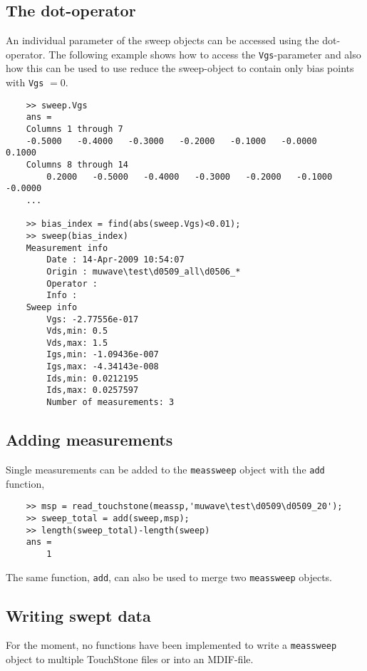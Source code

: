 \subsection{The dot-operator}
An individual parameter of the sweep objects can be accessed using
the dot-operator. The following example shows how to access the
\verb"Vgs"-parameter and also how this can be used to use reduce
the sweep-object to contain only bias points with \verb"Vgs" $=0$.
\begin{small}
\begin{verbatim}
    >> sweep.Vgs
    ans =
    Columns 1 through 7
    -0.5000   -0.4000   -0.3000   -0.2000   -0.1000   -0.0000    0.1000
    Columns 8 through 14
        0.2000   -0.5000   -0.4000   -0.3000   -0.2000   -0.1000   -0.0000
    ...

    >> bias_index = find(abs(sweep.Vgs)<0.01);
    >> sweep(bias_index)
    Measurement info
        Date : 14-Apr-2009 10:54:07
        Origin : muwave\test\d0509_all\d0506_*
        Operator :
        Info :
    Sweep info
    	Vgs: -2.77556e-017
    	Vds,min: 0.5
    	Vds,max: 1.5
    	Igs,min: -1.09436e-007
    	Igs,max: -4.34143e-008
    	Ids,min: 0.0212195
    	Ids,max: 0.0257597
    	Number of measurements: 3
\end{verbatim}
\end{small}

\subsection{Adding measurements}
Single measurements can be added to the \verb"meassweep" object
with the \verb"add" function,

\begin{small}
\begin{verbatim}
    >> msp = read_touchstone(meassp,'muwave\test\d0509\d0509_20');
    >> sweep_total = add(sweep,msp);
    >> length(sweep_total)-length(sweep)
    ans =
        1
\end{verbatim}
\end{small}
The same function, \verb"add", can also be used to merge two
\verb"meassweep" objects.

\subsection{Writing swept data}
For the moment, no functions have been implemented to write a
\verb"meassweep" object to multiple TouchStone files or into an
MDIF-file.
